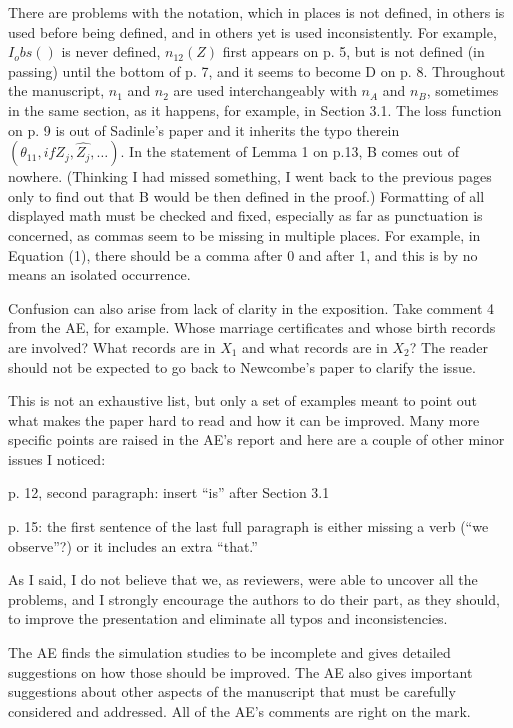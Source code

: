 \documentclass[letterpaper, parskip]{scrartcl}
\begin{document}
	There are problems with the notation, which in places is not defined, in others is used before being defined, and in others yet is used inconsistently.  For example, $I_obs()$ is never defined, $n_12(Z)$ first appears on p. 5, but is not defined (in passing) until the bottom of p. 7, and it seems to become D on p. 8.  Throughout the manuscript, $n_1$ and $n_2$ are used interchangeably with $n_A$ and $n_B$, sometimes in the same section, as it happens, for example, in Section 3.1.  The loss function on p. 9 is out of Sadinle’s paper and it inherits the typo therein $(\theta_11, if Z_j, \hat{Z_j}, …)$.  In the statement of Lemma 1 on p.13, B comes out of nowhere.  (Thinking I had missed something, I went back to the previous pages only to find out that B would be then defined in the proof.)  Formatting of all displayed math must be checked and fixed, especially as far as punctuation is concerned, as commas seem to be missing in multiple places.  For example, in Equation (1), there should be a comma after 0 and after 1, and this is by no means an isolated occurrence.
	
	Confusion can also arise from lack of clarity in the exposition.  Take comment 4 from the AE, for example.  Whose marriage certificates and whose birth records are involved?  What records are in $X_1$ and what records are in $X_2$?  The reader should not be expected to go back to Newcombe’s paper to clarify the issue. 
	
	This is not an exhaustive list, but only a set of examples meant to point out what makes the paper hard to read and how it can be improved.  Many more specific points are raised in the AE’s report and here are a couple of other minor issues I noticed:
	
	p. 12, second paragraph:  insert “is” after Section 3.1
	
	p. 15:  the first sentence of the last full paragraph is either missing a verb (“we observe”?) or it includes an extra “that.”
	
	As I said, I do not believe that we, as reviewers, were able to uncover all the problems, and I strongly encourage the authors to do their part, as they should, to improve the presentation and eliminate all typos and inconsistencies.
	
	The AE finds the simulation studies to be incomplete and gives detailed suggestions on how those should be improved.  The AE also gives important suggestions about other aspects of the manuscript that must be carefully considered and addressed.  All of the AE’s comments are right on the mark.
	
\end{document}

